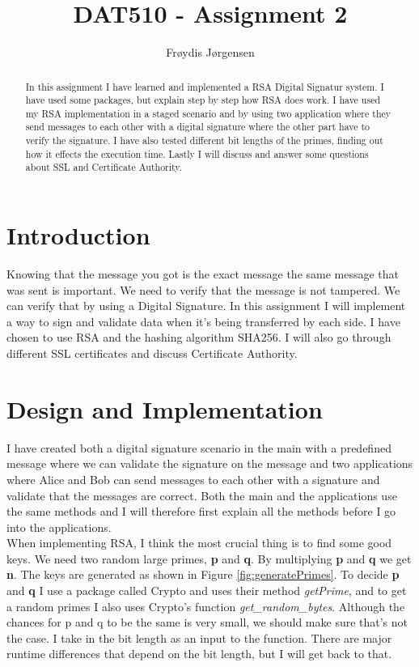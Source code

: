 \documentclass[12pt, letterpaper]{article}
\title{DAT510 - Assignment 2}
\author{Fr\o ydis J\o rgensen}
\begin{document}
\begin{titlepage}
\maketitle
\end{titlepage}

\begin{abstract}
In this assignment I have learned and implemented a RSA Digital Signatur system. I have used some packages, but explain step by step how RSA does work. I have used my RSA implementation in a staged scenario and by using two application where they send messages to each other with a digital signature where the other part have to verify the signature. I have also tested different bit lengths of the primes, finding out how it effects the execution time. Lastly I will discuss and answer some questions about SSL and Certificate Authority.
\end{abstract}

\section*{Introduction}
Knowing that the message you got is the exact message the same message that was sent is important. We need to verify that the message is not tampered. We can verify that by using a Digital Signature. In this assignment I will implement a way to sign and validate data when it's being transferred by each side. I have chosen to use RSA and the hashing algorithm SHA256. I will also go through different SSL certificates and discuss Certificate Authority.

\section*{Design and Implementation}
I have created both a digital signature scenario in the main with a predefined message where we can validate the signature on the message and two applications where Alice and Bob can send messages to each other with a signature and validate that the messages are correct. Both the main and the applications use the same methods and I will therefore first explain all the methods before I go into the applications. \\

When implementing RSA, I think the most crucial thing is to find some good keys. We need two random large primes, \textbf{p} and \textbf{q}. By multiplying \textbf{p} and \textbf{q} we get \textbf{n}. The keys are generated as shown in Figure \ref{fig:generatePrimes}. To decide \textbf{p} and \textbf{q} I use a package called Crypto and uses their method \textit{getPrime}, and to get a random primes I also uses Crypto's function \textit{get\_random\_bytes}. Although the chances for p and q to be the same is very small, we should make sure that's not the case. I take in the bit length as an input to the function. There are major runtime differences that depend on the bit length, but I will get back to that.
\end{document}
